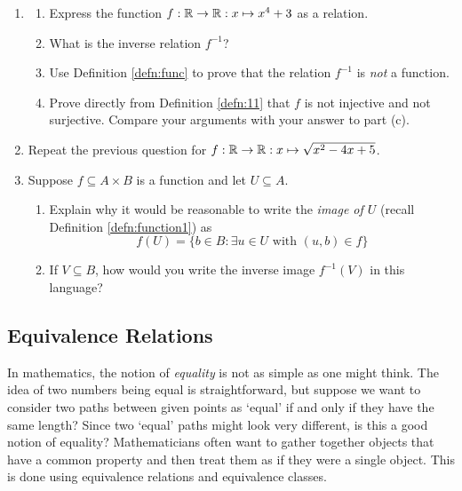 \begin{exercises}{}{}
\begin{enumerate}
  \item\begin{enumerate}
    \item Express the function $f:\mathbb{R}\to\mathbb{R}:x\mapsto x^4+3$ as a relation.
    \item What is the inverse relation $f^{-1}$?
    \item Use Definition \ref{defn:func} to prove that the relation $f^{-1}$ is \emph{not} a function.
    \item Prove directly from Definition \ref{defn:11} that $f$ is not injective and not surjective. Compare your arguments with your answer to part (c).
  \end{enumerate}
  
  \item Repeat the previous question for $f:\mathbb{R}\to\mathbb{R}:x\mapsto \sqrt{x^2-4x+5}$.
  
  
  
  \item Suppose $f\subseteq A\times B$ is a function and let $U\subseteq A$.
  \begin{enumerate}
    \item Explain why it would be reasonable to write the \emph{image of $U$} (recall Definition \ref{defn:function1}) as
    \[
    	f(U)=\bigl\{ b\in B:\exists u\in U\text{ with }(u,b)\in f\bigr\}
    \]
    \item If $V\subseteq B$, how would you write the inverse image $f^{-1}(V)$ in this language?
  \end{enumerate}
\end{enumerate}

\end{exercises}

\clearpage



\subsection{Equivalence Relations}\label{sec:equiv}

In mathematics, the notion of \emph{equality} is not as simple as one might think. The idea of two numbers being equal is straightforward, but suppose we want to consider two paths between given points as `equal' if and only if they have the same length? Since two `equal' paths might look very different, is this a good notion of equality? Mathematicians often want to gather together objects that have a common property and then treat them as if they were a single object. This is done using equivalence relations and equivalence classes.\par

